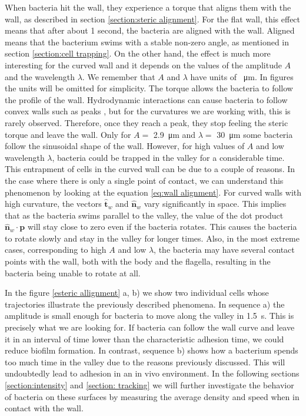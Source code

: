 When bacteria hit the wall, they experience a torque that aligns them with the wall, as described in section \ref{section:steric alignment}. For the flat wall, this effect means that after about 1 second, the bacteria are aligned with the wall. Aligned means that the bacterium swims with a stable non-zero angle, as mentioned in section \ref{section:cell trapping}. On the other hand, the effect is much more interesting for the curved wall and it depends on the values of the amplitude $A$ and the wavelength $\lambda$. We remember that $A$ and $\lambda$ have units of \SI{}{\micro\meter}. In figures the units will be omitted for simplicity. The torque allows the bacteria to follow the profile of the wall. Hydrodynamic interactions can cause bacteria to follow convex walls such as peaks \cite{Sipos2015HydrodynamicWalls}, but for the curvatures we are working with, this is rarely observed. Therefore, once they reach a peak, they stop feeling the steric torque and leave the wall. Only for $A=$ \SI{2.9}{\micro\meter} and $\lambda=$ \SI{30}{\micro\meter} some bacteria follow the sinusoidal shape of the wall. However, for high values of $A$ and low wavelength $\lambda$, bacteria could be trapped in the valley for a considerable time. This entrapment of cells in the curved wall can be due to a couple of reasons. In the case where there is only a single point of contact, we can understand this phenomenon by looking at the equation \eqref{eq:wall alignment}. For curved walls with high curvature, the vectors $\hat{\textbf{t}}_w$ and $\hat{\textbf{n}}_w$ vary significantly in space. This implies that as the bacteria swims parallel to the valley, the value of the dot product $\hat{\textbf{n}}_w \cdot \textbf{p}$ will stay close to zero even if the bacteria rotates. This causes the bacteria to rotate slowly and stay in the valley for longer times. Also, in the most extreme cases, corresponding to high $A$ and low $\lambda$, the bacteria may have several contact points with the wall, both with the body and the flagella, resulting in the bacteria being unable to rotate at all. 

In the figure \ref{esteric allignment} a, b) we show two individual cells whose trajectories illustrate the previously described phenomena. In sequence a) the amplitude is small enough for bacteria to move along the valley in \SI{1.5}{\second}. This is precisely what we are looking for. If bacteria can follow the wall curve and leave it in an interval of time lower than the characteristic adhesion time, we could reduce biofilm formation. In contrast, sequence b) shows how a bacterium spends too much time in the valley due to the reasons previously discussed. This will undoubtedly lead to adhesion in an in vivo environment. In the following sections \ref{section:intensity} and \ref{section: tracking} we will further investigate the behavior of bacteria on these surfaces by measuring the average density and speed when in contact with the wall. 

